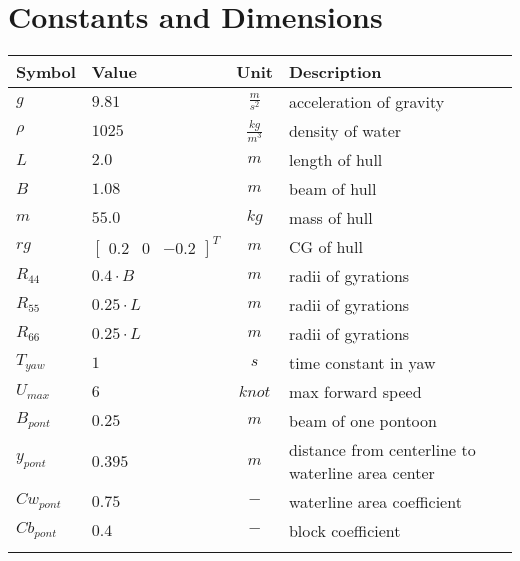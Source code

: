 \documentclass[12pt,a4]{article}
\begin{document}
\section{Constants and Dimensions}

\begin{table}[H]
	\centering
	\begin{tabular}{l|lcl}
		Symbol      & Value                           & Unit             & Description                                       \\\hline
		$g$         & $9.81$                          & $\frac{m}{s^2}$  & acceleration of gravity                           \\
		$\rho$      & $1025$                          & $\frac{kg}{m^3}$ & density of water                                  \\
		$L$         & $ 2.0 $                         & $m$              & length of hull                                    \\
		$B$         & $ 1.08 $                        & $m$              & beam of hull                                      \\
		$m$         & $ 55.0 $                        & $ kg $           & mass of hull                                      \\\hline
		$rg$        & $ \begin{bmatrix}0.2&0&-0.2\end{bmatrix}^T $ & $ m$             & CG of hull                                        \\
		$R_{44} $   & $0.4 \cdot B$                   & $m$              & radii of gyrations                                \\
		$R_{55} $   & $0.25\cdot L$                   & $m$              & radii of gyrations                                \\
		$R_{66} $   & $0.25\cdot L$                   & $m$              & radii of gyrations                                \\
		$T_{yaw}$   & $ 1$                            & $s $             & time constant in yaw                              \\
		$U_{max}$   & $ 6 $                           & $ knot $         & max forward speed                                 \\\hline
		$B_{pont} $ & $0.25 $                         & $ m $            & beam of one pontoon                               \\
		$y_{pont} $ & $0.395$                         & $ m $            & distance from centerline to waterline area center \\
		$Cw_{pont}$ & $0.75 $                         & $ - $            & waterline area coefficient                        \\
		$Cb_{pont}$ & $0.4$                           & $ - $            & block coefficient                                 \\
		$ $         & $ $                             & $  $             &                                                   \\
	\end{tabular}
\end{table}
\end{document}
